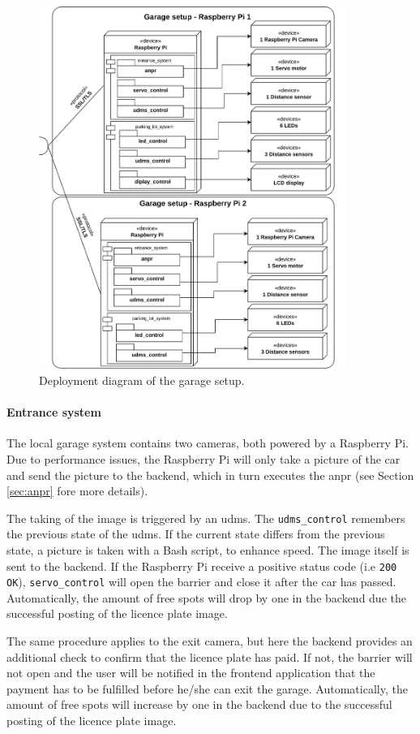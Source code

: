 \begin{figure}[hpt]
    \centering
    \includegraphics[width=10cm]{images/deployment_diagrams/deployment_diagram-rasperry_pi.drawio.png}
    \caption{Deployment diagram of the garage setup.}
    \label{fig:deployment-garage-setup}
\end{figure}

\paragraph{Entrance system}\label{sec:entrance-system}
The local garage system contains two cameras, both powered by a Raspberry Pi. Due to performance issues, the Raspberry Pi will only take a picture of the car and send the picture to the backend, which in turn executes the \ac{anpr} (see Section \ref{sec:anpr} fore more details). 

\ind The taking of the image is triggered by an \ac{udms}. The \verb|udms_control| remembers the previous state of the \ac{udms}. If the current state differs from the previous state, a picture is taken with a Bash script, to enhance speed. The image itself is sent to the backend. If the Raspberry Pi receive a positive status code (i.e \verb|200 OK|), \verb|servo_control| will open the barrier and close it after the car has passed. Automatically, the amount of free spots will drop by one in the backend due the successful posting of the licence plate image.

\ind The same procedure applies to the exit camera, but here the backend provides an additional check to confirm that the licence plate has paid. If not, the barrier will not open and the user will be notified in the frontend application that the payment has to be fulfilled before he/she can exit the garage. Automatically, the amount of free spots will increase by one in the backend due to the successful posting of the licence plate image.

